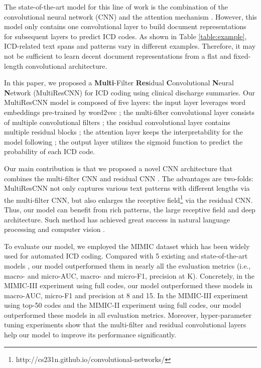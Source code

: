 \documentclass[letterpaper]{article} \usepackage{aaai20}  \usepackage{times}  \usepackage{helvet} \usepackage{courier}  \usepackage[hyphens]{url}  \usepackage{graphicx} \urlstyle{rm} \def\UrlFont{\rm}  \usepackage{graphicx}  \frenchspacing  \setlength{\pdfpagewidth}{8.5in}  \setlength{\pdfpageheight}{11in}
\begin{document}
The state-of-the-art model for this line of work is the combination of the convolutional neural network (CNN) and the attention mechanism \cite{mullenbach2018explainable}. However, this model only contains one convolutional layer to build document representations for subsequent layers to predict ICD codes. As shown in Table \ref{table:example}, ICD-related text spans and patterns vary in different examples. Therefore, it may not be sufficient to learn decent document representations from a flat and fixed-length convolutional architecture.





In this paper, we proposed a \textbf{Multi}-Filter \textbf{Res}idual \textbf{C}onvolutional \textbf{N}eural \textbf{N}etwork (MultiResCNN) for ICD coding using clinical discharge summaries. Our MultiResCNN model is composed of five layers: the input layer leverages word embeddings pre-trained by word2vec \cite{mikolov2013distributed}; the multi-filter convolutional layer consists of multiple convolutional filters \cite{kim2014convolutional}; the residual convolutional layer contains multiple residual blocks \cite{he2016deep}; the attention layer keeps the interpretability for the model following \cite{mullenbach2018explainable}; the output layer utilizes the sigmoid function to predict the probability of each ICD code.

Our main contribution is that we proposed a novel CNN architecture that combines the multi-filter CNN \cite{kim2014convolutional} and residual CNN \cite{he2016deep}. The advantages are two-folds: MultiResCNN not only captures various text patterns with different lengths via the multi-filter CNN, but also enlarges the receptive field\footnote{http://cs231n.github.io/convolutional-networks/} \cite{garcia2004convolutional} via the residual CNN. Thus, our model can benefit from rich patterns, the large receptive field and deep architecture. Such method has achieved great success in natural language processing \cite{vaswani2017attention} and computer vision \cite{NIPS2012_4824}. 


To evaluate our model, we employed the MIMIC dataset \cite{johnson2016mimic} which has been widely used for automated ICD coding. Compared with 5 existing and state-of-the-art models \cite{perotte2013diagnosis,prakash2017condensed,shi2017towards,baumel2018multi,mullenbach2018explainable}, our model outperformed them in nearly all the evaluation metrics (i.e., macro- and micro-AUC, macro- and micro-F1, precision at K). Concretely, in the MIMIC-III experiment using full codes, our model outperformed these models in macro-AUC, micro-F1 and precision at 8 and 15. In the MIMIC-III experiment using top-50 codes and the MIMIC-II experiment using full codes, our model outperformed these models in all evaluation metrics. Moreover, hyper-parameter tuning experiments show that the multi-filter and residual convolutional layers help our model to improve its performance significantly.
\end{document}
